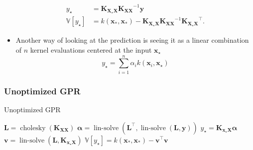 \documentclass[9pt,hyperref={pdfpagelabels=false},xcolor=table]{beamer}
\begin{document}
\begin{frame}
\begin{itemize}
              \begin{align*}
                  y_{\star}                           & = \bm{K_{X_{\star}X}} \bm{K_{XX}}^{-1} \bm{y}                                                             \\
                  \mathbb{V} \left[ y_{\star} \right] & = k (\bm{x}_{\ast},\bm{x}_{\ast}) - \bm{K_{X_{\star}X}} \bm{K_{XX}}^{-1} \bm{K_{X_{\star}X}}^{\intercal}.
              \end{align*}
              \pause
        \item Another way of looking at the prediction is seeing it as a linear combination of $n$ kernel evaluations centered at the input $\bm{x}_{\star}$
              \[
                  y_{\star} = \sum_{i=1}^{n} \alpha_i k \left( \bm{x}_i , \bm{x}_{\star} \right)
              \]

    \end{itemize}
\end{frame}

\begin{frame}
    \frametitle{Unoptimized GPR}
    {\centering
        \begin{minipage}{.9\linewidth}
            \begin{algorithm}[H]
                \caption{Unoptimized GPR}
                \SetAlgoLined
                \DontPrintSemicolon

                \BlankLine
                $\bm{L} = \operatorname{cholesky} \left( \bm{K_{XX}} \right)$\;
                $\bm{\alpha} = \operatorname{lin-solve} \left( \bm{L}^{\intercal} , \operatorname{lin-solve} \left( \bm{L}, \bm{y} \right) \right)$\;
                $y_{\star} = \bm{K_{x_{\star} X}} \bm{\alpha}$\;
                $\bm{v} = \operatorname{lin-solve} \left( \bm{L}, \bm{K_{x_{\star} X}} \right)$\;
                $\mathbb{V} \left[ y_{\star} \right] = k (\bm{x}_{\ast},\bm{x}_{\ast}) - \bm{v}^{\intercal} \bm{v}$\;
                \BlankLine
            \end{algorithm}
        \end{minipage}
        \par
    }
\end{frame}
\end{document}
